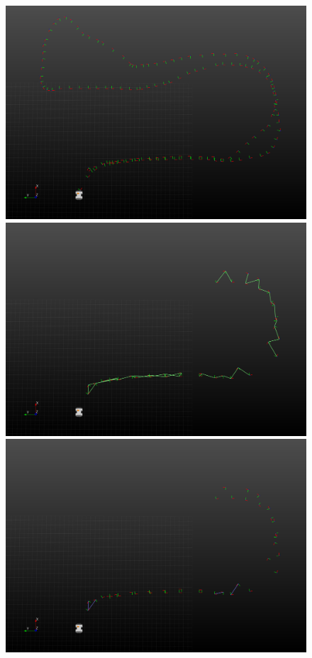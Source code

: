 \documentclass[12pt]{article}
\begin{document}
\begin{figure}
\begin{minipage}{0.67\textwidth}
\centering
\includegraphics[width=\textwidth]{LoopClosureTimeSampling}
\includegraphics[width=\textwidth]{LoopClosureEuclideanSampling}
\includegraphics[width=\textwidth]{LoopClosureFinal}

\end{minipage}
\end{figure}
\end{document}
